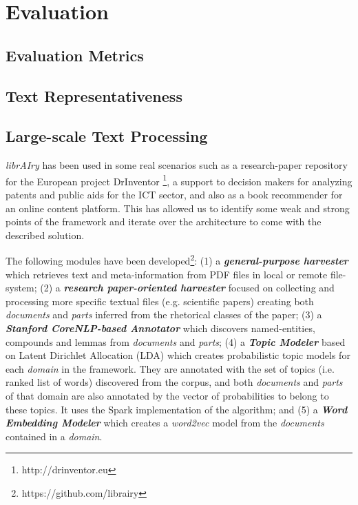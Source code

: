 

\chapter{Evaluation}\label{ch:evaluation}

\graphicspath{{evaluation/figures/}}


\section{Evaluation Metrics}

\section{Text Representativeness}

\section{Large-scale Text Processing}

\textit{librAIry} has been used in some real scenarios such as a research-paper repository for the European project DrInventor \footnote{http://drinventor.eu}, a support to decision makers for analyzing patents and public aids for the ICT sector, and also as a book recommender for an online content platform. This has allowed us to identify some weak and strong points of the framework and iterate over the architecture to come with the described solution. 

The following modules have been developed\footnote{https://github.com/librairy}: (1) a \textbf{\textit{general-purpose harvester}} which retrieves text and meta-information from PDF files in local or remote file-system; (2) a \textbf{\textit{research paper-oriented harvester}} focused on collecting and processing more specific textual files (e.g. scientific papers) creating both \textit{documents} and \textit{parts} inferred from the rhetorical classes of the paper; (3) a \textbf{\textit{Stanford CoreNLP-based Annotator}} which discovers named-entities, compounds and lemmas from \textit{documents} and \textit{parts}; (4) a \textbf{\textit{Topic Modeler}} based on Latent Dirichlet Allocation (LDA) which creates probabilistic topic models for each \textit{domain} in the framework. They are annotated with the set of topics (i.e. ranked list of words) discovered from the corpus, and both \textit{documents} and \textit{parts} of that domain are also annotated by the vector of probabilities to belong to these topics. It uses the Spark implementation of the algorithm; and (5) a \textbf{\textit{Word Embedding Modeler}} which creates a \textit{word2vec} model from the \textit{documents} contained in a \textit{domain}.

